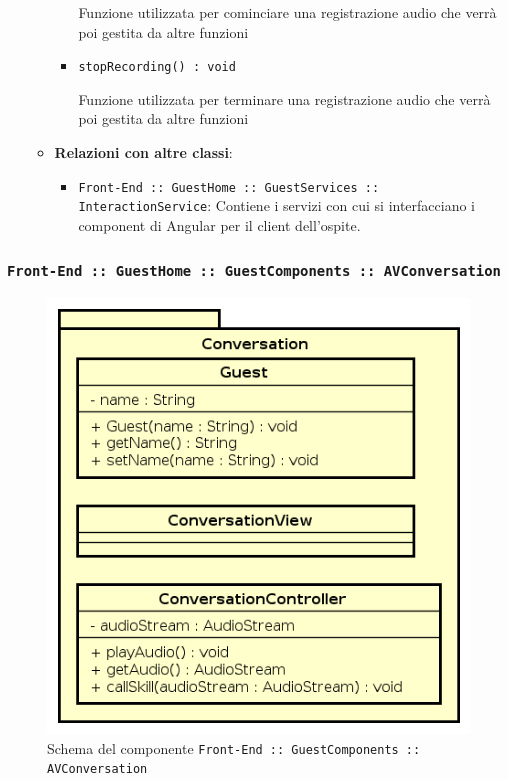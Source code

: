 \documentclass[../DefinizioneDiProdotto.tex]{subfiles}
\begin{document}
\begin{itemize}
\begin{itemize}
\begin{itemize}
	 Funzione utilizzata per cominciare una registrazione audio che verrà poi gestita da altre funzioni
	\end{itemize}\vspace{0.5em}
	\begin{itemize}
	\item \texttt{stopRecording() : void}\

	 Funzione utilizzata per terminare una registrazione audio che verrà poi gestita da altre funzioni

	\end{itemize}\vspace{0.5em}
	\item \textbf{Relazioni con altre classi}:
	\begin{itemize}
	\item \texttt{Front-End :: GuestHome :: GuestServices :: InteractionService}: Contiene i servizi con cui si interfacciano i component di Angular per il client dell'ospite.
	\end{itemize}
	\end{itemize}\end{itemize}

	\newpage
	\subsubsection{ \texttt{Front-End :: GuestHome :: GuestComponents :: AVConversation}}
	\begin{figure}[!h]
		\centering
		\includegraphics[scale=0.7]{Architettura/Front-End/GuestHome/Components/Conversation.png}
		\caption{Schema del componente \texttt{Front-End :: GuestComponents :: AVConversation}}
	\end{figure}
\end{document}
